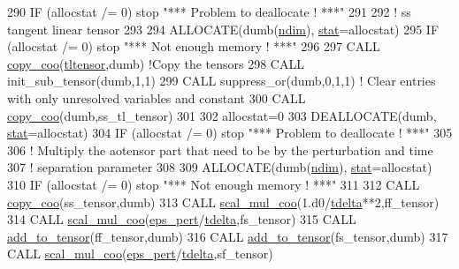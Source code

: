 \begin{DoxyCode}
290     \textcolor{keywordflow}{IF} (allocstat /= 0)  stop \textcolor{stringliteral}{"*** Problem to deallocate ! ***"}
291 
292     \textcolor{comment}{! ss tangent linear tensor}
293 
294     \textcolor{keyword}{ALLOCATE}(dumb(\hyperlink{namespaceparams_a2323fe1773f086e20c14f266351c482b}{ndim}), \hyperlink{namespacestat}{stat}=allocstat)
295     \textcolor{keywordflow}{IF} (allocstat /= 0) stop \textcolor{stringliteral}{"*** Not enough memory ! ***"}
296 
297     \textcolor{keyword}{CALL }\hyperlink{namespacetensor_a14f95c256cdf137ca0767ddb3c87deea}{copy\_coo}(\hyperlink{namespacetl__ad__tensor_a6180cfcc4d4ad119ef93266ea955903c}{tltensor},dumb) \textcolor{comment}{!Copy the tensors}
298     \textcolor{keyword}{CALL }init\_sub\_tensor(dumb,1,1)
299     \textcolor{keyword}{CALL }suppress\_or(dumb,0,1,1) \textcolor{comment}{! Clear entries with only unresolved variables and constant}
300     \textcolor{keyword}{CALL }\hyperlink{namespacetensor_a14f95c256cdf137ca0767ddb3c87deea}{copy\_coo}(dumb,ss\_tl\_tensor)
301 
302     allocstat=0
303     \textcolor{keyword}{DEALLOCATE}(dumb, \hyperlink{namespacestat}{stat}=allocstat)
304     \textcolor{keywordflow}{IF} (allocstat /= 0)  stop \textcolor{stringliteral}{"*** Problem to deallocate ! ***"}
305 
306     \textcolor{comment}{! Multiply the aotensor part that need to be by the perturbation and time}
307     \textcolor{comment}{! separation parameter}
308     
309     \textcolor{keyword}{ALLOCATE}(dumb(\hyperlink{namespaceparams_a2323fe1773f086e20c14f266351c482b}{ndim}), \hyperlink{namespacestat}{stat}=allocstat)
310     \textcolor{keywordflow}{IF} (allocstat /= 0) stop \textcolor{stringliteral}{"*** Not enough memory ! ***"}
311 
312     \textcolor{keyword}{CALL }\hyperlink{namespacetensor_a14f95c256cdf137ca0767ddb3c87deea}{copy\_coo}(ss\_tensor,dumb)
313     \textcolor{keyword}{CALL }\hyperlink{namespacetensor_af105ec6083969c52f5e7422d75a5cda5}{scal\_mul\_coo}(1.d0/\hyperlink{namespacestoch__params_a3995bce17d12b533df6b86ab0072b7c3}{tdelta}**2,ff\_tensor)
314     \textcolor{keyword}{CALL }\hyperlink{namespacetensor_af105ec6083969c52f5e7422d75a5cda5}{scal\_mul\_coo}(\hyperlink{namespacestoch__params_aa0504e89179fe42b3f3206811f1592dc}{eps\_pert}/\hyperlink{namespacestoch__params_a3995bce17d12b533df6b86ab0072b7c3}{tdelta},fs\_tensor)
315     \textcolor{keyword}{CALL }\hyperlink{namespacetensor_aad7cd55f3a4cec4676cc7ca34b05f1a8}{add\_to\_tensor}(ff\_tensor,dumb)
316     \textcolor{keyword}{CALL }\hyperlink{namespacetensor_aad7cd55f3a4cec4676cc7ca34b05f1a8}{add\_to\_tensor}(fs\_tensor,dumb)
317     \textcolor{keyword}{CALL }\hyperlink{namespacetensor_af105ec6083969c52f5e7422d75a5cda5}{scal\_mul\_coo}(\hyperlink{namespacestoch__params_aa0504e89179fe42b3f3206811f1592dc}{eps\_pert}/\hyperlink{namespacestoch__params_a3995bce17d12b533df6b86ab0072b7c3}{tdelta},sf\_tensor)

\end{DoxyCode}
